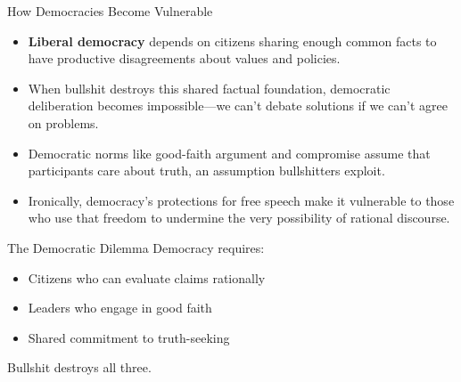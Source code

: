\documentclass{beamer}
\begin{document}
	\begin{frame}{How Democracies Become Vulnerable}
		\begin{itemize}
			\item \textbf{Liberal democracy} depends on citizens sharing enough common facts to have productive disagreements about values and policies.
			\item When bullshit destroys this shared factual foundation, democratic deliberation becomes impossible—we can't debate solutions if we can't agree on problems.
			\item Democratic norms like good-faith argument and compromise assume that participants care about truth, an assumption bullshitters exploit.
			\item Ironically, democracy's protections for free speech make it vulnerable to those who use that freedom to undermine the very possibility of rational discourse.
		\end{itemize}
		
		\begin{alertblock}{The Democratic Dilemma}
			\scriptsize
			Democracy requires:
			\begin{itemize}
				\item Citizens who can evaluate claims rationally
				\item Leaders who engage in good faith
				\item Shared commitment to truth-seeking
			\end{itemize}
			Bullshit destroys all three.
		\end{alertblock}
	\end{frame}
	
\end{document}
